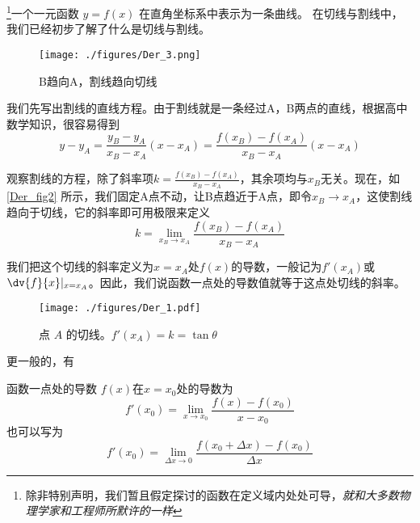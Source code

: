 
\footnote{除非特别声明，我们暂且假定探讨的函数在定义域内处处可导，\textsl{就和大多数物理学家和工程师所默许的一样}}一个一元函数 $y = f(x)$ 在直角坐标系中表示为一条曲线。 在切线与割线中，我们已经初步了解了什么是切线与割线。

\begin{figure}[ht]
\centering
\texttt{[image: ./figures/Der\_3.png]}
\caption{B趋向A，割线趋向切线} \label{Der_fig2}
\end{figure}

我们先写出割线的直线方程。由于割线就是一条经过A，B两点的直线，根据高中数学知识，很容易得到
\begin{equation}
y-y_A=\frac{y_B-y_A}{x_B-x_A}(x-x_A)=\frac{f(x_B)-f(x_A)}{x_B-x_A}(x-x_A)
\end{equation}

观察割线的方程，除了斜率项$k=\frac{f(x_B)-f(x_A)}{x_B-x_A}$，其余项均与$x_B$无关。现在，如\autoref{Der_fig2} 所示，我们固定A点不动，让B点趋近于A点，即令$x_B\rightarrow x_A$，这使割线趋向于切线，它的斜率即可用极限来定义
\begin{equation}
k=\lim_{x_B\to x_A}\frac{f(x_B)-f(x_A)}{x_B-x_A}
\end{equation}

我们把这个切线的斜率定义为$x=x_A$处$f(x)$的导数，一般记为$f'(x_A)$或$\dv{f}{x}|_{x=x_A}$。因此，我们说函数一点处的导数值就等于这点处切线的斜率。

\begin{figure}[ht]
\centering
\texttt{[image: ./figures/Der\_1.pdf]}
\caption{点 $A$ 的切线。$f'(x_A)=k=\tan \theta$}
\end{figure}

更一般的，有
\begin{definition}{函数一点处的导数}
$f(x)$在$x=x_0$处的导数为
\begin{equation}
f'(x_0)=\lim_{x\to x_0}\frac{f(x)-f(x_0)}{x-x_0}
\end{equation}
也可以写为
\begin{equation}\label{Der_eq2}
f'(x_0)=\lim_{\Delta x \to 0}\frac{f(x_0+\Delta x)-f(x_0)}{\Delta x}
\end{equation}
\end{definition}

